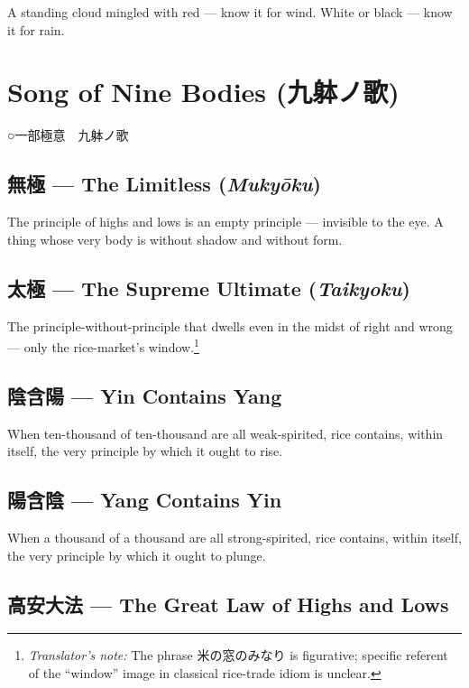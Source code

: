 \documentclass[10pt, openany]{book}
\newcommand{\jp}[1]{{\japanesefont #1}}
\newcommand{\tn}[1]{\footnote{\textit{Translator's note:} #1}}
\begin{document}
A standing cloud mingled with red --- know it for wind. White or
black --- know it for rain.

\section{Song of Nine Bodies (\jp{九躰ノ歌})}

\begin{center}
\jp{○一部極意　九躰ノ歌}
\end{center}

\subsection*{\jp{無極} --- The Limitless (\textit{Muky\=oku})}

The principle of highs and lows is an empty principle --- invisible
to the eye. A thing whose very body is without shadow and without
form.

\subsection*{\jp{太極} --- The Supreme Ultimate (\textit{Taikyoku})}

The principle-without-principle that dwells even in the midst of
right and wrong --- only the rice-market's window.\tn{The
phrase \jp{米の窓のみなり} is figurative; specific referent of
the ``window'' image in classical rice-trade idiom is unclear.}

\subsection*{\jp{陰含陽} --- Yin Contains Yang}

When ten-thousand of ten-thousand are all weak-spirited, rice
contains, within itself, the very principle by which it ought to
rise.

\subsection*{\jp{陽含陰} --- Yang Contains Yin}

When a thousand of a thousand are all strong-spirited, rice
contains, within itself, the very principle by which it ought to
plunge.

\subsection*{\jp{高安大法} --- The Great Law of Highs and Lows}
\end{document}
